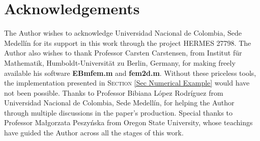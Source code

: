 \documentclass[3p]{elsarticle}
\begin{document}
\section*{Acknowledgements}
%
%
%
%
The Author wishes to acknowledge Universidad Nacional de Colombia, Sede Medell\'in for its support in this work through the project HERMES 27798. The Author also wishes to thank Professor Carsten Carstensen, from Institut f\"{u}r Mathematik, Humboldt-Universit\"at zu Berlin, Germany, for making freely available his software \textbf{EBmfem.m} and \textbf{fem2d.m}. Without these priceless tools, the implementation presented in \textsc{Section}  \ref{Sec Numerical Example} would have not been possible. Thanks to Professor Bibiana L\'opez Rodr\'iguez from Universidad Nacional de Colombia, Sede Medell\'in, for helping the Author through multiple discussions in the paper's production. Special thanks to Professor Ma\l{}gorzata Peszy\'nska from Oregon State University, whose teachings have guided the Author across all the stages of this work.



%
%
\end{document}
